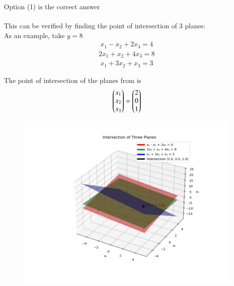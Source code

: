\documentclass[journal]{IEEEtran}
\begin{document}
Option (1) is the correct answer \\ \\ 

This can be verified by finding the point of intersection of 3 planes:\\
As an example, take $y = 8$
\begin{align}
x_1 - x_2 + 2x_3 = 4
\end{align}
\begin{align}
2x_1 + x_2 + 4x_3 = 8
\end{align}
\begin{align}
x_1 + 3x_2 + x_3 = 3
\end{align}

The point of intersection of the planes from  is
\begin{align}
\begin{pmatrix}x_1 \\ x_2 \\ x_3\end{pmatrix} = \begin{pmatrix}2 \\ 0 \\ 1\end{pmatrix}
\end{align}

\begin{figure}[H]
    \centering
    \includegraphics[height=0.5\textheight, keepaspectratio]{figs/Figure_1.png}
    \label{figure_1}
\end{figure}
\end{document}
